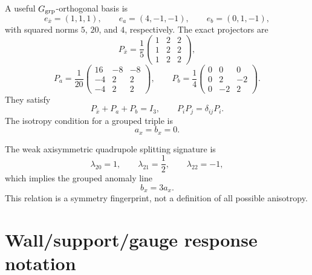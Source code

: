 A useful \(G_{\rm grp}\)-orthogonal basis is
\begin{equation}
  e_{\bar x}=(1,1,1),
  \qquad
  e_a=(4,-1,-1),
  \qquad
  e_b=(0,1,-1),
\end{equation}
with squared norms \(5\), \(20\), and \(4\), respectively.  The exact projectors are
\begin{equation}
  P_{\bar x}=\frac15
  \begin{pmatrix}
  1&2&2\\
  1&2&2\\
  1&2&2
  \end{pmatrix},
\end{equation}
\begin{equation}
  P_a=\frac1{20}
  \begin{pmatrix}
  16&-8&-8\\
  -4&2&2\\
  -4&2&2
  \end{pmatrix},
  \qquad
  P_b=\frac14
  \begin{pmatrix}
  0&0&0\\
  0&2&-2\\
  0&-2&2
  \end{pmatrix}.
\end{equation}
They satisfy
\begin{equation}
  P_{\bar x}+P_a+P_b=I_3,
  \qquad
  P_iP_j=\delta_{ij}P_i.
\end{equation}
The isotropy condition for a grouped triple is
\begin{equation}
  a_x=b_x=0.
\end{equation}

The weak axisymmetric quadrupole splitting signature is
\begin{equation}
  \lambda_{20}=1,
  \qquad
  \lambda_{21}=\frac12,
  \qquad
  \lambda_{22}=-1,
\end{equation}
which implies the grouped anomaly line
\begin{equation}
  b_x=3a_x.
\end{equation}
This relation is a symmetry fingerprint, not a definition of all possible anisotropy.

\section{Wall/support/gauge response notation}
\label{sec:response-notation}

